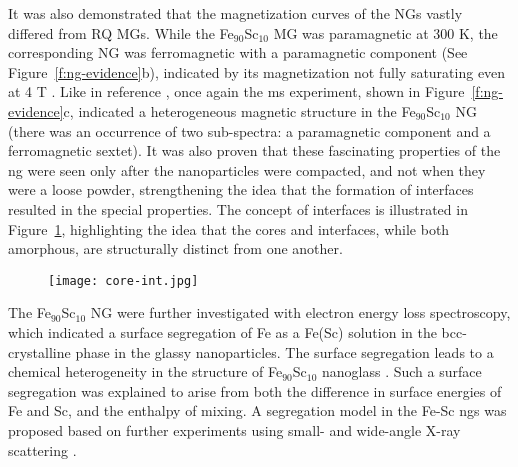 It was also demonstrated that the magnetization curves of the NGs vastly differed from RQ MGs. While the Fe$_{90}$Sc$_{10}$ MG was paramagnetic at 300 K, the corresponding NG was ferromagnetic with a paramagnetic component (See Figure~\ref{f:ng-evidence}b), indicated by its magnetization not fully saturating even at 4 T \cite{Witte2013}. Like in reference \cite{Jing1989}, once again the \gls{ms} experiment, shown in Figure~\ref{f:ng-evidence}c, indicated a heterogeneous magnetic structure in the Fe$_{90}$Sc$_{10}$ NG (there was an occurrence of two sub-spectra: a paramagnetic component and a ferromagnetic sextet). It was also proven that these fascinating properties of the \gls{ng} were seen only after the nanoparticles were compacted, and not when they were a loose powder, strengthening the idea that the formation of interfaces resulted in the special properties. The concept of interfaces is illustrated in Figure~\ref{f:ng-core-int}, highlighting the idea that the cores and interfaces, while both amorphous, are structurally distinct from one another. \par

\begin{figure}[!h] \centering
	\texttt{[image: core-int.jpg]}
	\label{f:ng-core-int}
\end{figure}

The Fe$_{90}$Sc$_{10}$ NG were further investigated with electron energy loss spectroscopy, which indicated a surface segregation of Fe as a Fe(Sc) solution in the bcc-crystalline phase in the glassy nanoparticles. The surface segregation leads to a chemical heterogeneity in the structure of Fe$_{90}$Sc$_{10}$ nanoglass \cite{Wang2016}. Such a surface segregation was explained to arise from both the difference in surface energies of Fe and Sc, and the enthalpy of mixing. A segregation model in the Fe-Sc \gls{ng}s was proposed based on further experiments using small- and wide-angle X-ray scattering \cite{Wang2017}. \par

